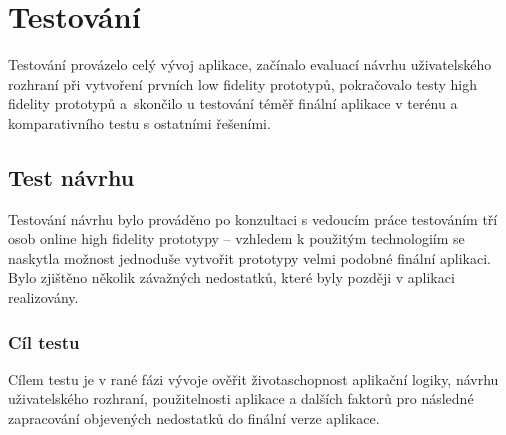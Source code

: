 \chapter{Testování}
Testování provázelo celý vývoj aplikace, začínalo evaluací návrhu uživatelského rozhraní při vytvoření prvních low fidelity prototypů, pokračovalo testy high fidelity prototypů a~skon\-či\-lo u testování téměř finální aplikace v terénu a komparativního testu s ostatními řešeními.


\section{Test návrhu}
\label{sec:testhfp}
Testování návrhu bylo prováděno po konzultaci s vedoucím práce testováním tří osob online high fidelity prototypy -- vzhledem k použitým technologiím se naskytla možnost jednoduše vytvořit prototypy velmi podobné finální aplikaci. Bylo zjištěno několik závažných nedostatků, které byly později v aplikaci realizovány.

\subsection{Cíl testu}
Cílem testu je v rané fázi vývoje ověřit životaschopnost aplikační logiky, návrhu uživatelského rozhraní, použitelnosti aplikace a dalších faktorů pro následné zapracování objevených nedostatků do finální verze aplikace.

